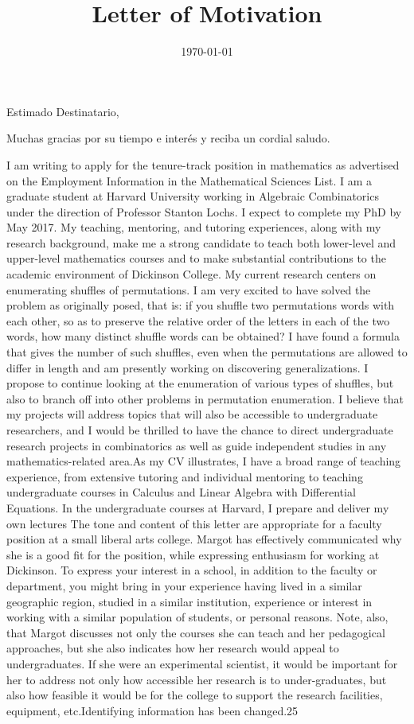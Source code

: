 \documentclass[11pt,a4paper,roman]{moderncv}        %
\title{Letter of Motivation}                               %
\begin{document}
\date{\today}
\opening{Estimado Destinatario,}
\closing{Muchas gracias por su tiempo e interés y reciba un cordial saludo.}
\makelettertitle

I am writing to apply for the tenure-track position in mathematics as advertised on the Employment Information in the Mathematical Sciences List. I am a graduate student at Harvard University working in Algebraic Combinatorics under the direction of Professor Stanton Lochs. I expect to complete my PhD by May 2017. My teaching, mentoring, and tutoring experiences, along with my research background, make me a strong candidate to teach both lower-level and upper-level mathematics courses and to make substantial contributions to the academic environment of Dickinson College. My current research centers on enumerating shuffles of permutations. I am very excited to have solved the problem as originally posed, that is: if you shuffle two permutations words with each other, so as to preserve the relative order of the letters in each of the two words, how many distinct shuffle words can be obtained? I have found a formula that gives the number of such shuffles, even when the permutations are allowed to differ in length and am presently working on discovering generalizations.  I propose to continue looking at the enumeration of various types of shuffles, but also to branch off into other problems in permutation enumeration. I believe that my projects will address topics that will also be accessible to undergraduate researchers, and I would be thrilled to have the chance to direct undergraduate research projects in combinatorics as well as guide independent studies in any mathematics-related area.As my CV illustrates, I have a broad range of teaching experience, from extensive tutoring and individual mentoring to teaching undergraduate courses in Calculus and Linear Algebra with Differential Equations. In the undergraduate courses at Harvard, I prepare and deliver my own lectures The tone and content of this letter are appropriate for a faculty position at a small liberal arts college.  Margot has effectively communicated why she is a good fit for the position, while expressing enthusiasm for working at Dickinson. To express your interest in a school, in addition to the faculty or department, you might bring in your experience having lived in a similar geographic region, studied in a similar institution, experience or interest in working with a similar population of students, or personal reasons. Note, also, that Margot discusses not only the courses she can teach and her pedagogical approaches, but she also indicates how her research would appeal to undergraduates.  If she were an experimental scientist, it would be important for her to address not only how accessible her research is to under-graduates, but also how feasible it would be for the college to support the research facilities, equipment, etc.Identifying information has been changed.25
\end{document}
